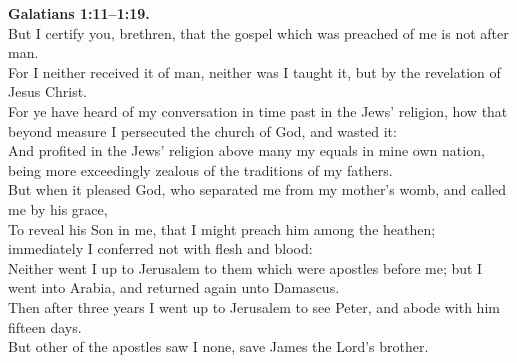 \documentclass[10pt]{article} %
\begin{document}
{\begin{minipage}[t]{0.45\textwidth}
\textbf{Galatians 1:11--1:19.}\\
But I certify you, brethren, that the gospel which was preached of me is not after man.\\
For I neither received it of man, neither was I taught it, but by the revelation of Jesus Christ.\\
For ye have heard of my conversation in time past in the Jews' religion, how that beyond measure I persecuted the church of God, and wasted it:\\
And profited in the Jews' religion above many my equals in mine own nation, being more exceedingly zealous of the traditions of my fathers.\\
But when it pleased God, who separated me from my mother's womb, and called me by his grace,\\
To reveal his Son in me, that I might preach him among the heathen; immediately I conferred not with flesh and blood:\\
Neither went I up to Jerusalem to them which were apostles before me; but I went into Arabia, and returned again unto Damascus.\\
Then after three years I went up to Jerusalem to see Peter, and abode with him fifteen days.\\
But other of the apostles saw I none, save James the Lord's brother.\\

\end{minipage}}
\vspace*{\fill}
\newpage
\Huge%
\vspace*{\fill}
\begin{spacing}{1.3}%
\end{spacing}
\vspace*{\fill}
\end{document}
